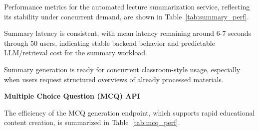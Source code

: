 Performance metrics for the automated lecture summarization service, reflecting its stability under concurrent demand, are shown in Table~\ref{tab:summary_perf}.

\begin{table}[H]
    \centering
    \caption{Summary Performance Matrix.}
    \label{tab:summary_perf}
\end{table}

Summary latency is consistent, with mean latency remaining around 6-7 seconds through 50 users, indicating stable backend behavior and predictable LLM/retrieval cost for the summary workload.

Summary generation is ready for concurrent classroom-style usage, especially when users request structured overviews of already processed materials.

\textbf{Multiple Choice Question (MCQ) API}

The efficiency of the MCQ generation endpoint, which supports rapid educational content creation, is summarized in Table~\ref{tab:mcq_perf}.

\begin{table}[H]
    \centering
    \caption{Multiple Choice Question Performance Matrix.}
    \label{tab:mcq_perf}
\end{table}

